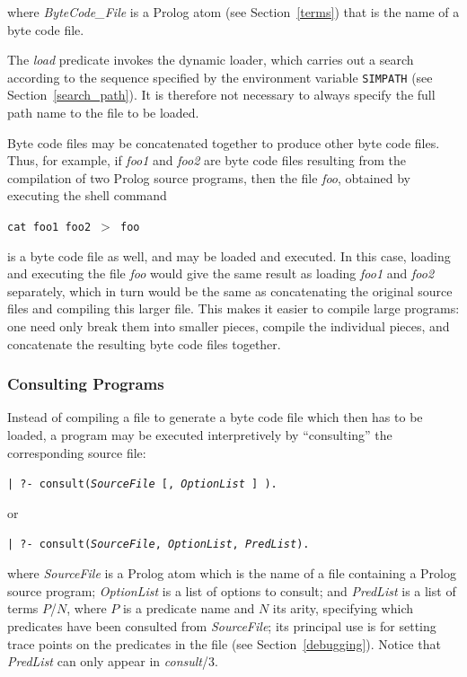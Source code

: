 where {\em ByteCode\_File} is a Prolog atom (see Section~\ref{terms})
that is the name of a byte code file.

The {\em load} predicate invokes the dynamic loader,
which carries out a search according to
the sequence specified by the environment variable {\tt SIMPATH}
(see Section~\ref{search_path}).
It is therefore not necessary to always specify the full path name to the file
to be loaded.

Byte code files may be concatenated together to produce other byte code files.
Thus, for example, if {\em foo1} and {\em foo2} are byte code files resulting
from the compilation of two Prolog source programs, then the file {\em foo},
obtained by executing the shell command
\begin{center}
{\tt cat foo1 foo2 $>$ foo}
\end{center}
is a byte code file as well, and may be loaded and executed.
In this case,
loading and executing the file {\em foo} would give the same result as
loading {\em foo1} and {\em foo2} separately,
which in turn would be the same as
concatenating the original source files and compiling this larger file.
This makes it easier to compile large programs:
one need only break them into smaller pieces, compile the individual pieces,
and concatenate the resulting byte code files together.

\subsubsection{Consulting Programs}

Instead of compiling a file to generate a byte code file
which then has to be loaded,
a program may be executed interpretively by ``consulting'' the corresponding
source file:
\begin{center}
{\tt | ?- consult({\em SourceFile} [, {\em OptionList} ] ).}
\end{center}
or
\begin{center}
{\tt | ?- consult({\em SourceFile}, {\em OptionList}, {\em PredList}).}
\end{center}
where {\em SourceFile} is a Prolog atom which is the name of a file
containing a Prolog source program;
{\em OptionList} is a list of options
to consult; and {\em PredList} is a list of terms $P$/$N$,
where $P$ is a predicate name and $N$ its arity,
specifying which predicates have been consulted from {\em SourceFile};
its principal use is for setting trace points
on the predicates in the file (see Section~\ref{debugging}).
Notice that {\em PredList} can only appear in {\em consult}/3.

